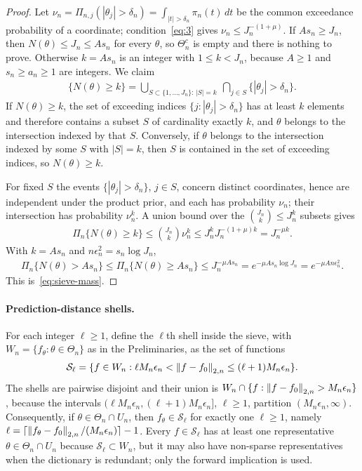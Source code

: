 \begin{proof}
Let $\nu_n=\Pi_{n,j}(|\theta_j|>\delta_n)=\int_{|t|>\delta_n}\pi_n(t)\,dt$ be the common exceedance probability of a coordinate; condition~\eqref{eq:3} gives $\nu_n\leq J_n^{-(1+\mu)}$. If $As_n\geq J_n$, then $N(\theta)\leq J_n\leq As_n$ for every $\theta$, so $\Theta_n^c$ is empty and there is nothing to prove. Otherwise $k=As_n$ is an integer with $1\leq k<J_n$, because $A\geq1$ and $s_n\geq a_n\geq1$ are integers. We claim
\begin{align*}
\{N(\theta)\geq k\}
=\bigcup_{S\subset\{1,\ldots,J_n\}:\,|S|=k}\ \bigcap_{j\in S}\{|\theta_j|>\delta_n\}.
\end{align*}
If $N(\theta)\geq k$, the set of exceeding indices $\{j:|\theta_j|>\delta_n\}$ has at least $k$ elements and therefore contains a subset $S$ of cardinality exactly $k$, and $\theta$ belongs to the intersection indexed by that $S$. Conversely, if $\theta$ belongs to the intersection indexed by some $S$ with $|S|=k$, then $S$ is contained in the set of exceeding indices, so $N(\theta)\geq k$.

For fixed $S$ the events $\{|\theta_j|>\delta_n\}$, $j\in S$, concern distinct coordinates, hence are independent under the product prior, and each has probability $\nu_n$; their intersection has probability $\nu_n^k$. A union bound over the $\binom{J_n}{k}\leq J_n^k$ subsets gives
\begin{align*}
\Pi_n\{N(\theta)\geq k\}
\leq\binom{J_n}{k}\nu_n^k
\leq J_n^kJ_n^{-(1+\mu)k}
=J_n^{-\mu k}.
\end{align*}
With $k=As_n$ and $n\epsilon_n^2=s_n\log J_n$,
\begin{align*}
\Pi_n\{N(\theta)>As_n\}
\leq\Pi_n\{N(\theta)\geq As_n\}
\leq J_n^{-\mu As_n}
=e^{-\mu As_n\log J_n}
=e^{-\mu An\epsilon_n^2}.
\end{align*}
This is~\eqref{eq:sieve-mass}.
\end{proof}

\paragraph*{Prediction-distance shells.}
For each integer $\ell\geq1$, define the $\ell$th shell inside the sieve, with $W_n=\{f_\theta:\theta\in\Theta_n\}$ as in the Preliminaries, as the set of functions
\begin{align}
\mathcal S_\ell=\{f\in W_n:\ell M_n\epsilon_n<\left\lVert f-f_0 \right\rVert_{2,n}\leq(\ell+1)M_n\epsilon_n\}.
\label{eq:shell}
\end{align}
The shells are pairwise disjoint and their union is $W_n\cap\{f:\left\lVert f-f_0 \right\rVert_{2,n}>M_n\epsilon_n\}$, because the intervals $(\ell M_n\epsilon_n,(\ell+1)M_n\epsilon_n]$, $\ell\geq1$, partition $(M_n\epsilon_n,\infty)$. Consequently, if $\theta\in\Theta_n\cap U_n$, then $f_\theta\in\mathcal S_\ell$ for exactly one $\ell\geq1$, namely $\ell=\lceil\left\lVert f_\theta-f_0 \right\rVert_{2,n}/(M_n\epsilon_n)\rceil-1$. Every $f\in\mathcal S_\ell$ has at least one representative $\theta\in\Theta_n\cap U_n$ because $\mathcal S_\ell\subset W_n$, but it may also have non-sparse representatives when the dictionary is redundant; only the forward implication is used.


